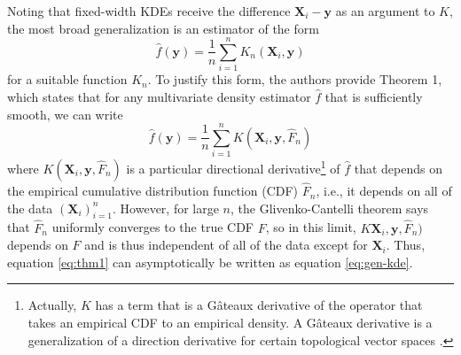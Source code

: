 \documentclass{article}
\begin{document}
Noting that fixed-width KDEs receive the difference $\mathbf{X}_i-\mathbf{y}$ as an argument to $K$, the most broad generalization is an estimator of the form 
\begin{equation}\label{eq:gen-kde}
    \hat{f}(\mathbf{y}) = \frac{1}{n} \sum_{i=1}^n K_n(\mathbf{X}_i,\mathbf{y}) 
\end{equation}
for a suitable function $K_n$. To justify this form, the authors provide Theorem 1, which states that for any multivariate density estimator $\hat{f}$ that is sufficiently smooth, we can write 
\begin{equation}\label{eq:thm1}
    \hat{f}(\mathbf{y}) = \frac{1}{n} \sum_{i=1}^n K(\mathbf{X}_i,\mathbf{y},\hat{F}_n)
\end{equation}
where $K(\mathbf{X}_i,\mathbf{y},\hat{F}_n)$ is a particular directional derivative\footnote{Actually, $K$ has a term that is a G\^ateaux derivative of the operator that takes an empirical CDF to an empirical density. A G\^ateaux derivative is a generalization of a direction derivative for certain topological vector spaces \cite{gateaux}.} of $\hat{f}$ that depends on the empirical cumulative distribution function (CDF) $\hat{F}_n$, i.e., it depends on all of the data $(\mathbf{X}_i)_{i=1}^n$. However, for large $n$, the Glivenko-Cantelli theorem \cite{jnw} says that $\hat{F}_n$ uniformly converges to the true CDF $F$, so in this limit, $K\mathbf{X}_i,\mathbf{y},\hat{F}_n)$ depends on $F$ and is thus independent of all of the data except for $\mathbf{X}_i$. Thus, equation \eqref{eq:thm1} can asymptotically be written as equation \eqref{eq:gen-kde}. 
\end{document}
